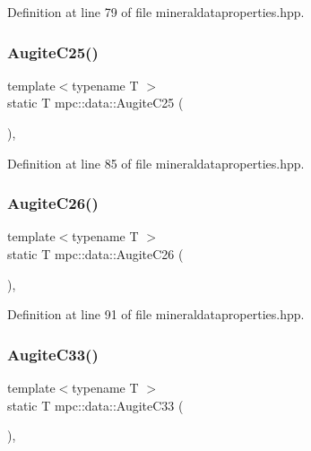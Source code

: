 Definition at line 79 of file mineraldataproperties.\+hpp.

\mbox{\label{namespacempc_1_1data_a2db867527e844bcd4b6e7da9bee97d7f}} 
\subsubsection{\texorpdfstring{Augite\+C25()}{AugiteC25()}}
{\footnotesize\ttfamily template$<$typename T $>$ \\
static T mpc\+::data\+::\+Augite\+C25 (\begin{DoxyParamCaption}{ }\end{DoxyParamCaption})\hspace{0.3cm}{\ttfamily [inline]}, {\ttfamily [static]}}



Definition at line 85 of file mineraldataproperties.\+hpp.

\mbox{\label{namespacempc_1_1data_a96496f5ce74e903c5ba2596632171cf8}} 
\subsubsection{\texorpdfstring{Augite\+C26()}{AugiteC26()}}
{\footnotesize\ttfamily template$<$typename T $>$ \\
static T mpc\+::data\+::\+Augite\+C26 (\begin{DoxyParamCaption}{ }\end{DoxyParamCaption})\hspace{0.3cm}{\ttfamily [inline]}, {\ttfamily [static]}}



Definition at line 91 of file mineraldataproperties.\+hpp.

\mbox{\label{namespacempc_1_1data_ad16dafe49c4ce862479eae0a64f345c8}} 
\subsubsection{\texorpdfstring{Augite\+C33()}{AugiteC33()}}
{\footnotesize\ttfamily template$<$typename T $>$ \\
static T mpc\+::data\+::\+Augite\+C33 (\begin{DoxyParamCaption}{ }\end{DoxyParamCaption})\hspace{0.3cm}{\ttfamily [inline]}, {\ttfamily [static]}}



